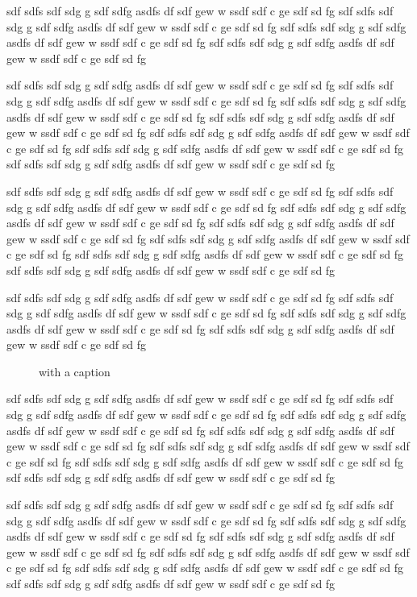 \documentclass{article}
\begin{document}
sdf sdfs  sdf sdg g sdf sdfg asdfs df sdf gew w ssdf sdf c ge sdf sd fg
sdf sdfs  sdf sdg g sdf sdfg asdfs df sdf gew w ssdf sdf c ge sdf sd fg
sdf sdfs  sdf sdg g sdf sdfg asdfs df sdf gew w ssdf sdf c ge sdf sd fg
sdf sdfs  sdf sdg g sdf sdfg asdfs df sdf gew w ssdf sdf c ge sdf sd fg

sdf sdfs  sdf sdg g sdf sdfg asdfs df sdf gew w ssdf sdf c ge sdf sd fg
sdf sdfs  sdf sdg g sdf sdfg asdfs df sdf gew w ssdf sdf c ge sdf sd fg
sdf sdfs  sdf sdg g sdf sdfg asdfs df sdf gew w ssdf sdf c ge sdf sd fg
sdf sdfs  sdf sdg g sdf sdfg asdfs df sdf gew w ssdf sdf c ge sdf sd fg
sdf sdfs  sdf sdg g sdf sdfg asdfs df sdf gew w ssdf sdf c ge sdf sd fg
sdf sdfs  sdf sdg g sdf sdfg asdfs df sdf gew w ssdf sdf c ge sdf sd fg
sdf sdfs  sdf sdg g sdf sdfg asdfs df sdf gew w ssdf sdf c ge sdf sd fg

sdf sdfs  sdf sdg g sdf sdfg asdfs df sdf gew w ssdf sdf c ge sdf sd fg
sdf sdfs  sdf sdg g sdf sdfg asdfs df sdf gew w ssdf sdf c ge sdf sd fg
sdf sdfs  sdf sdg g sdf sdfg asdfs df sdf gew w ssdf sdf c ge sdf sd fg
sdf sdfs  sdf sdg g sdf sdfg asdfs df sdf gew w ssdf sdf c ge sdf sd fg
sdf sdfs  sdf sdg g sdf sdfg asdfs df sdf gew w ssdf sdf c ge sdf sd fg
sdf sdfs  sdf sdg g sdf sdfg asdfs df sdf gew w ssdf sdf c ge sdf sd fg
sdf sdfs  sdf sdg g sdf sdfg asdfs df sdf gew w ssdf sdf c ge sdf sd fg

sdf sdfs  sdf sdg g sdf sdfg asdfs df sdf gew w ssdf sdf c ge sdf sd fg
sdf sdfs  sdf sdg g sdf sdfg asdfs df sdf gew w ssdf sdf c ge sdf sd fg
sdf sdfs  sdf sdg g sdf sdfg asdfs df sdf gew w ssdf sdf c ge sdf sd fg
sdf sdfs  sdf sdg g sdf sdfg asdfs df sdf gew w ssdf sdf c ge sdf sd fg

\begin{figure}[ht]
\caption{with a caption}\label{fig:2}
\end{figure}

sdf sdfs  sdf sdg g sdf sdfg asdfs df sdf gew w ssdf sdf c ge sdf sd fg
sdf sdfs  sdf sdg g sdf sdfg asdfs df sdf gew w ssdf sdf c ge sdf sd fg
sdf sdfs  sdf sdg g sdf sdfg asdfs df sdf gew w ssdf sdf c ge sdf sd fg
sdf sdfs  sdf sdg g sdf sdfg asdfs df sdf gew w ssdf sdf c ge sdf sd fg
sdf sdfs  sdf sdg g sdf sdfg asdfs df sdf gew w ssdf sdf c ge sdf sd fg
sdf sdfs  sdf sdg g sdf sdfg asdfs df sdf gew w ssdf sdf c ge sdf sd fg
sdf sdfs  sdf sdg g sdf sdfg asdfs df sdf gew w ssdf sdf c ge sdf sd fg

sdf sdfs  sdf sdg g sdf sdfg asdfs df sdf gew w ssdf sdf c ge sdf sd fg
sdf sdfs  sdf sdg g sdf sdfg asdfs df sdf gew w ssdf sdf c ge sdf sd fg
sdf sdfs  sdf sdg g sdf sdfg asdfs df sdf gew w ssdf sdf c ge sdf sd fg
sdf sdfs  sdf sdg g sdf sdfg asdfs df sdf gew w ssdf sdf c ge sdf sd fg
sdf sdfs  sdf sdg g sdf sdfg asdfs df sdf gew w ssdf sdf c ge sdf sd fg
sdf sdfs  sdf sdg g sdf sdfg asdfs df sdf gew w ssdf sdf c ge sdf sd fg
sdf sdfs  sdf sdg g sdf sdfg asdfs df sdf gew w ssdf sdf c ge sdf sd fg
\end{document}
